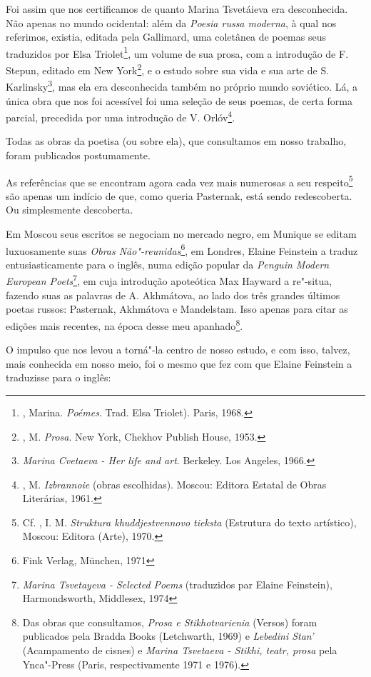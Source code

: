 Foi assim que nos certificamos de quanto Marina Tsvetáieva era
desconhecida. Não apenas no mundo ocidental: além da \emph{Poesia russa
moderna}, à qual nos referimos, existia, editada pela Gallimard, uma
coletânea de poemas seus traduzidos por Elsa Triolet\footnote{,
  Marina. \emph{Poémes}. Trad. Elsa Triolet). Paris, 1968.}, um volume
de sua prosa, com a introdução de F. Stepun, editado em New
York\footnote{, M. \emph{Prosa}. New York, Chekhov Publish
  House, 1953.}, e o estudo sobre sua vida e sua arte de S.
Karlinsky\footnote{\emph{Marina Cvetaeva - Her life and art}. Berkeley.
  Los Angeles, 1966.}, mas ela era desconhecida também no próprio mundo
soviético. Lá, a única obra que nos foi acessível foi uma seleção de
seus poemas, de certa forma parcial, precedida por uma introdução de V.
Orlóv\footnote{, M. \emph{Izbrannoie} (obras escolhidas).
  Moscou: Editora Estatal de Obras Literárias, 1961.}.

Todas as obras da poetisa (ou sobre ela), que consultamos em nosso
trabalho, foram publicados postumamente.

As referências que se encontram agora cada vez mais numerosas a seu
respeito\footnote{Cf. , I. M. \emph{Struktura khuddjestvennovo
  tieksta} (Estrutura do texto artístico), Moscou: Editora (Arte), 1970.}
são apenas um indício de que, como queria Pasternak, está sendo
redescoberta. Ou simplesmente descoberta.

Em Moscou seus escritos se negociam no mercado negro, em Munique se
editam luxuosamente suas \emph{Obras Não"-reunidas}\footnote{Fink Verlag,
  München, 1971}, em Londres, Elaine Feinstein a traduz
entusiasticamente para o inglês, numa edição popular da \emph{Penguin
Modern European Poets}\footnote{\emph{Marina Tsvetayeva - Selected
  Poems} (traduzidos par Elaine Feinstein), Harmondsworth, Middlesex,
  1974}, em cuja introdução apoteótica Max Hayward a re"-situa, fazendo
suas as palavras de A. Akhmátova, ao lado dos três grandes últimos
poetas russos: Pasternak, Akhmátova e Mandelstam. Isso apenas para citar
as edições mais recentes, na época desse meu apanhado\footnote{Das obras que consultamos, \emph{Prosa
  e Stikhotvarienia} (Versos) foram publicados pela Bradda Books
  (Letchwarth, 1969) e \emph{Lebedini Stan'} (Acampamento de cisnes) e
  \emph{Marina Tsvetaeva - Stikhi, teatr, prosa} pela Ynca"-Press (Paris,
  respectivamente 1971 e 1976).}.

O impulso que nos levou a torná"-la centro de nosso estudo, e com isso,
talvez, mais conhecida em nosso meio, foi o mesmo que fez com que Elaine
Feinstein a traduzisse para o inglês:

